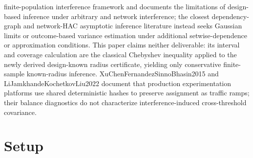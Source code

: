 \documentclass{article}
\begin{document}
finite-population interference framework and documents the limitations of design-based inference under arbitrary and network interference; the closest dependency-graph and network-HAC asymptotic inference literature instead seeks Gaussian limits or outcome-based variance estimation under additional setwise-dependence or approximation conditions. This paper claims neither deliverable: its interval and coverage calculation are the classical Chebyshev inequality applied to the newly derived design-known radius certificate, yielding only conservative finite-sample known-radius inference. XuChenFernandezSinnoBhasin2015 and LiJamkhandeKochetkovLiu2022 document that production experimentation platforms use shared deterministic hashes to preserve assignment as traffic ramps; their balance diagnostics do not characterize interference-induced cross-threshold covariance.

\section{Setup}
\end{document}
